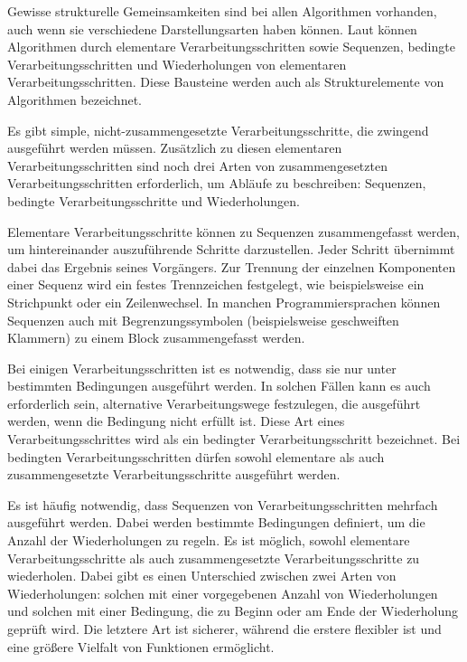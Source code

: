 Gewisse strukturelle Gemeinsamkeiten sind bei allen Algorithmen vorhanden, auch wenn sie verschiedene Darstellungsarten haben können. Laut \textcite[12-14]{hubwieser_fundamente_2015} können Algorithmen durch elementare Verarbeitungsschritten sowie Sequenzen, bedingte Verarbeitungsschritten und Wiederholungen von elementaren Verarbeitungsschritten. Diese Bausteine werden auch als Strukturelemente von Algorithmen bezeichnet.

Es gibt simple, nicht-zusammengesetzte  Verarbeitungsschritte, die zwingend ausgeführt werden müssen. Zusätzlich zu diesen elementaren Verarbeitungsschritten sind noch drei Arten von zusammengesetzten Verarbeitungsschritten erforderlich, um Abläufe zu beschreiben: Sequenzen, bedingte Verarbeitungsschritte und Wiederholungen. 

Elementare Verarbeitungsschritte können zu Sequenzen zusammengefasst werden, um hintereinander auszuführende Schritte darzustellen. Jeder Schritt übernimmt dabei das Ergebnis seines Vorgängers. Zur Trennung der einzelnen Komponenten einer Sequenz wird ein festes Trennzeichen festgelegt, wie beispielsweise ein Strichpunkt oder ein Zeilenwechsel. In manchen Programmiersprachen können Sequenzen auch mit Begrenzungssymbolen (beispielsweise geschweiften Klammern) zu einem Block zusammengefasst werden.

Bei einigen Verarbeitungsschritten ist es notwendig, dass sie nur unter bestimmten Bedingungen ausgeführt werden. In solchen Fällen kann es auch erforderlich sein, alternative Verarbeitungswege festzulegen, die ausgeführt werden, wenn die Bedingung nicht erfüllt ist. Diese Art eines Verarbeitungsschrittes wird als ein bedingter Verarbeitungsschritt bezeichnet. Bei bedingten Verarbeitungsschritten dürfen sowohl elementare als auch zusammengesetzte Verarbeitungsschritte ausgeführt werden.

Es ist häufig notwendig, dass Sequenzen von Verarbeitungsschritten mehrfach ausgeführt werden. Dabei werden bestimmte Bedingungen definiert, um die Anzahl der Wiederholungen zu regeln. Es ist möglich, sowohl elementare Verarbeitungsschritte als auch zusammengesetzte Verarbeitungsschritte zu wiederholen. Dabei gibt es einen Unterschied zwischen zwei Arten von Wiederholungen: solchen mit einer vorgegebenen Anzahl von Wiederholungen und solchen mit einer Bedingung, die zu Beginn oder am Ende der Wiederholung geprüft wird. Die letztere Art ist sicherer, während die erstere flexibler ist und eine größere Vielfalt von Funktionen ermöglicht.

